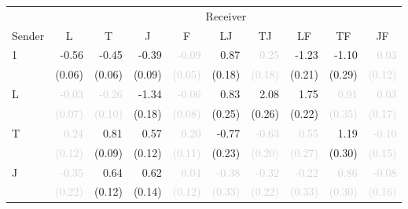\begin{tabular}{lrrrrrrrrr}
\toprule
& \multicolumn{9}{c}{Receiver} \\
\cmidrule(l){2-10} 
Sender & \multicolumn{1}{c}{L} & \multicolumn{1}{c}{T} & \multicolumn{1}{c}{J} & \multicolumn{1}{c}{F} & \multicolumn{1}{c}{LJ} & \multicolumn{1}{c}{TJ} & \multicolumn{1}{c}{LF} & \multicolumn{1}{c}{TF} & \multicolumn{1}{c}{JF} \\
\midrule
\multirow{2}{*}{1} &-0.56 &-0.45 &-0.39 &\textcolor{LightGray}{-0.09} &0.87 &\textcolor{LightGray}{0.25} &-1.23 &-1.10 &\textcolor{LightGray}{0.03}\\
 &\tiny{(0.06)} &\tiny{(0.06)} &\tiny{(0.09)} &\textcolor{LightGray}{\tiny{(0.05)}} &\tiny{(0.18)} &\textcolor{LightGray}{\tiny{(0.18)}} &\tiny{(0.21)} &\tiny{(0.29)} &\textcolor{LightGray}{\tiny{(0.12)}}\\[1ex]
\multirow{2}{*}{L} &\cellcolor{Gray}\textcolor{LightGray}{-0.03} &\textcolor{LightGray}{-0.26} &-1.34 &\textcolor{LightGray}{-0.06} &0.83 &2.08 &1.75 &\textcolor{LightGray}{0.91} &\textcolor{LightGray}{0.03}\\
 &\cellcolor{Gray}\textcolor{LightGray}{\tiny{(0.07)}} &\textcolor{LightGray}{\tiny{(0.10)}} &\tiny{(0.18)} &\textcolor{LightGray}{\tiny{(0.08)}} &\tiny{(0.25)} &\tiny{(0.26)} &\tiny{(0.22)} &\textcolor{LightGray}{\tiny{(0.35)}} &\textcolor{LightGray}{\tiny{(0.17)}}\\[1ex]
\multirow{2}{*}{T} &\textcolor{LightGray}{0.24} &\cellcolor{Gray}0.81 &0.57 &\textcolor{LightGray}{0.20} &-0.77 &\textcolor{LightGray}{-0.63} &\textcolor{LightGray}{0.55} &1.19 &\textcolor{LightGray}{-0.10}\\
 &\textcolor{LightGray}{\tiny{(0.12)}} &\cellcolor{Gray}\tiny{(0.09)} &\tiny{(0.12)} &\textcolor{LightGray}{\tiny{(0.11)}} &\tiny{(0.23)} &\textcolor{LightGray}{\tiny{(0.20)}} &\textcolor{LightGray}{\tiny{(0.27)}} &\tiny{(0.30)} &\textcolor{LightGray}{\tiny{(0.15)}}\\[1ex]
\multirow{2}{*}{J} &\textcolor{LightGray}{-0.35} &0.64 &\cellcolor{Gray}0.62 &\textcolor{LightGray}{0.04} &\textcolor{LightGray}{-0.38} &\textcolor{LightGray}{-0.32} &\textcolor{LightGray}{-0.22} &\textcolor{LightGray}{0.86} &\textcolor{LightGray}{-0.08}\\
 &\textcolor{LightGray}{\tiny{(0.22)}} &\tiny{(0.12)} &\cellcolor{Gray}\tiny{(0.14)} &\textcolor{LightGray}{\tiny{(0.12)}} &\textcolor{LightGray}{\tiny{(0.33)}} &\textcolor{LightGray}{\tiny{(0.22)}} &\textcolor{LightGray}{\tiny{(0.33)}} &\textcolor{LightGray}{\tiny{(0.30)}} &\textcolor{LightGray}{\tiny{(0.16)}}\\[1ex]

\end{tabular}
